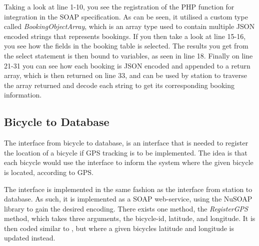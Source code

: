 Taking a look at line 1-10, you see the registration of the PHP function for integration in the SOAP specification.
As can be seen, it utilised a custom type called \textit{BookingObjectArray}, which is an array type used to contain multiple JSON encoded strings that represents bookings.
If you then take a look at line 15-16, you see how the fields in the booking table is selected.
The results you get from the select statement is then bound to variables, as seen in line 18.
Finally on line 21-31 you can see how each booking is JSON encoded and appended to a return array, which is then returned on line 33, and can be used by station to traverse the array returned and decode each string to get its corresponding booking information.

\subsection{Bicycle to Database}
The interface from bicycle to database, is an interface that is needed to register the location of a bicycle if GPS tracking is to be implemented.
The idea is that each bicycle would use the interface to inform the system where the given bicycle is located, according to GPS.

The interface is implemented in the same fashion as the interface from station to database.
As such, it is implemented as a SOAP web-service, using the NuSOAP library to gain the desired encoding.
There exists one method, the \textit{RegisterGPS} method, which takes three arguments, the bicycle-id, latitude, and longitude.
It is then coded similar to , but where a given bicycles latitude and longitude is updated instead.
